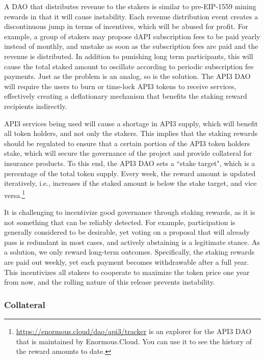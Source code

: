 \documentclass[11pt]{article}
\begin{document}
A DAO that distributes revenue to the stakers is similar to pre-EIP-1559 mining rewards in that it will cause instability.
Each revenue distribution event creates a discontinuous jump in terms of incentives, which will be abused for profit.
For example, a group of stakers may propose dAPI subscription fees to be paid yearly instead of monthly, and unstake as soon as the subscription fees are paid and the revenue is distributed.
In addition to punishing long term participants, this will cause the total staked amount to oscillate according to periodic subscription fee payments.
Just as the problem is an analog, so is the solution.
The API3 DAO will require the users to burn or time-lock API3 tokens to receive services, effectively creating a deflationary mechanism that benefits the staking reward recipients indirectly.

API3 services being used will cause a shortage in API3 supply, which will benefit all token holders, and not only the stakers.
This implies that the staking rewards should be regulated to ensure that a certain portion of the API3 token holders stake, which will secure the governance of the project and provide collateral for insurance products.
To this end, the API3 DAO sets a ``stake target", which is a percentage of the total token supply.
Every week, the reward amount is updated iteratively, i.e., increases if the staked amount is below the stake target, and vice versa.\footnote{\url{https://enormous.cloud/dao/api3/tracker} is an explorer for the API3 DAO that is maintained by Enormous.Cloud. You can use it to see the history of the reward amounts to date.}

It is challenging to incentivize good governance through staking rewards, as it is not something that can be reliably detected.
For example, participation is generally considered to be desirable, yet voting on a proposal that will already pass is redundant in most cases, and actively abstaining is a legitimate stance.
As a solution, we only reward long-term outcomes.
Specifically, the staking rewards are paid out weekly, yet each payment becomes withdrawable after a full year.
This incentivizes all stakers to cooperate to maximize the token price one year from now, and the rolling nature of this release prevents instability.

\subsubsection{Collateral}
\label{sec:collateral}
\end{document}
